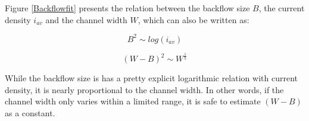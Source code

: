 Figure \ref{Backflowfit} presents the relation between the backflow size $B$, the current density $i_{av}$ and the channel width $W$, which can also be written as:

\begin{equation}
    B^2 \sim log(i_{av})
\end{equation}

\begin{equation}
    (W-B)^2 \sim W^{\frac{1}{5}}
\end{equation}

While the backflow size is has a pretty explicit logarithmic relation with current density, it is nearly proportional to the channel width. In other words, if the channel width only varies within a limited range, it is safe to estimate $(W-B)$ as a constant.




